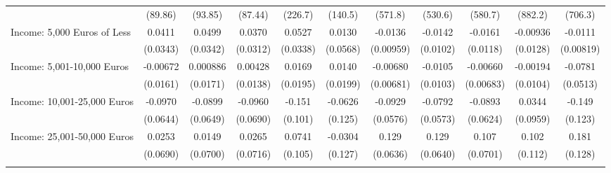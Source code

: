 {\begin{tabular}{l*{10}{c}}
            &     (89.86)         &     (93.85)         &     (87.44)         &     (226.7)         &     (140.5)         &     (571.8)         &     (530.6)         &     (580.7)         &     (882.2)         &     (706.3)         \\
\addlinespace
Income: 5,000 Euros of Less&      0.0411         &      0.0499         &      0.0370         &      0.0527         &      0.0130         &     -0.0136         &     -0.0142         &     -0.0161         &    -0.00936         &     -0.0111         \\
            &    (0.0343)         &    (0.0342)         &    (0.0312)         &    (0.0338)         &    (0.0568)         &   (0.00959)         &    (0.0102)         &    (0.0118)         &    (0.0128)         &   (0.00819)         \\
\addlinespace
Income: 5,001-10,000 Euros&    -0.00672         &    0.000886         &     0.00428         &      0.0169         &      0.0140         &    -0.00680         &     -0.0105         &    -0.00660         &    -0.00194         &     -0.0781         \\
            &    (0.0161)         &    (0.0171)         &    (0.0138)         &    (0.0195)         &    (0.0199)         &   (0.00681)         &    (0.0103)         &   (0.00683)         &    (0.0104)         &    (0.0513)         \\
\addlinespace
Income: 10,001-25,000 Euros&     -0.0970         &     -0.0899         &     -0.0960         &      -0.151         &     -0.0626         &     -0.0929         &     -0.0792         &     -0.0893         &      0.0344         &      -0.149         \\
            &    (0.0644)         &    (0.0649)         &    (0.0690)         &     (0.101)         &     (0.125)         &    (0.0576)         &    (0.0573)         &    (0.0624)         &    (0.0959)         &     (0.123)         \\
\addlinespace
Income: 25,001-50,000 Euros&      0.0253         &      0.0149         &      0.0265         &      0.0741         &     -0.0304         &       0.129\sym{*}  &       0.129\sym{*}  &       0.107         &       0.102         &       0.181         \\
            &    (0.0690)         &    (0.0700)         &    (0.0716)         &     (0.105)         &     (0.127)         &    (0.0636)         &    (0.0640)         &    (0.0701)         &     (0.112)         &     (0.128)         \\
\addlinespace

\end{tabular}}

